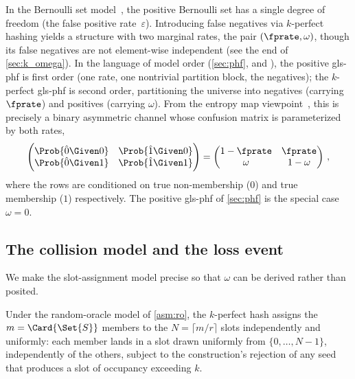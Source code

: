 \documentclass[ ../main.tex]{subfiles}
\begin{document}
In the Bernoulli set model~\cite{bsets}, the positive Bernoulli set has a single degree of freedom (the false positive rate~$\varepsilon$). Introducing false negatives via $k$-perfect hashing yields a structure with two marginal rates, the pair $(\fprate, \omega)$, though its false negatives are not element-wise independent (see the end of \cref{sec:k_omega}). In the language of model order (\cref{sec:phf}, and \cite{bsets,bmaps}), the positive \gls{gls-phf} is first order (one rate, one nontrivial partition block, the negatives); the $k$-perfect \gls{gls-phf} is second order, partitioning the universe into negatives (carrying $\fprate$) and positives (carrying $\omega$). From the entropy map viewpoint~\cite{emaps}, this is precisely a binary asymmetric channel whose confusion matrix is parameterized by both rates,
\begin{equation}
\label{eq:k_channel}
    \begin{pmatrix}
        \Prob{\hat 0 \Given 0} & \Prob{\hat 1 \Given 0}\\
        \Prob{\hat 0 \Given 1} & \Prob{\hat 1 \Given 1}
    \end{pmatrix}
    =
    \begin{pmatrix}
        1-\fprate & \fprate\\
        \omega & 1-\omega
    \end{pmatrix}\,,
\end{equation}
where the rows are conditioned on true non-membership ($0$) and true membership ($1$) respectively. The positive \gls{gls-phf} of \cref{sec:phf} is the special case $\omega = 0$.

\subsection{The collision model and the loss event}
\label{sec:k_loss_model}
We make the slot-assignment model precise so that $\omega$ can be derived rather than posited.

\begin{assumption}
\label{asm:uniform_slots}
Under the random-oracle model of \cref{asm:ro}, the $k$-perfect hash assigns the $m = \Card{\Set{S}}$ members to the $N = \lceil m/r \rceil$ slots independently and uniformly: each member lands in a slot drawn uniformly from $\{0,\ldots,N-1\}$, independently of the others, subject to the construction's rejection of any seed that produces a slot of occupancy exceeding $k$.
\end{assumption}
\end{document}
